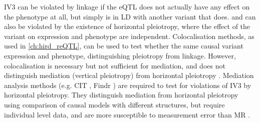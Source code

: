IV3 can be violated by linkage if the eQTL does not actually have any effect on the phenotype at all, 
but simply is in \gls{LD} with another variant that does.
and can also be violated by the existence of horizontal pleiotropy, 
where the effect of the variant on expression and phenotype are independent.
Colocalisation methods, as used in \cref{ch:hird_reQTL}, can be used to test whether the same causal variant expression and phenotype, distinguishing pleiotropy from linkage.
However, colocalisation is necessary but not sufficient for mediation,
and does not distinguish mediation (vertical pleiotropy) from horizontal pleiotropy \autocite{hemani2018EvaluatingPotentialRole}.
%
Mediation analysis methods (e.g. CIT \autocite{millstein2009DisentanglingMolecularRelationships}, Findr \autocite{wang2017EfficientAccurateCausal}) are required to test for violations of IV3 by horizontal pleiotropy.
They distinguish mediation from horizontal pleiotropy using comparison of causal models with different structures,
but require individual level data, and are more susceptible to measurement error than \gls{MR} \autocite{hemani2017OrientingCausalRelationship,hemani2018EvaluatingPotentialRole}.
%



